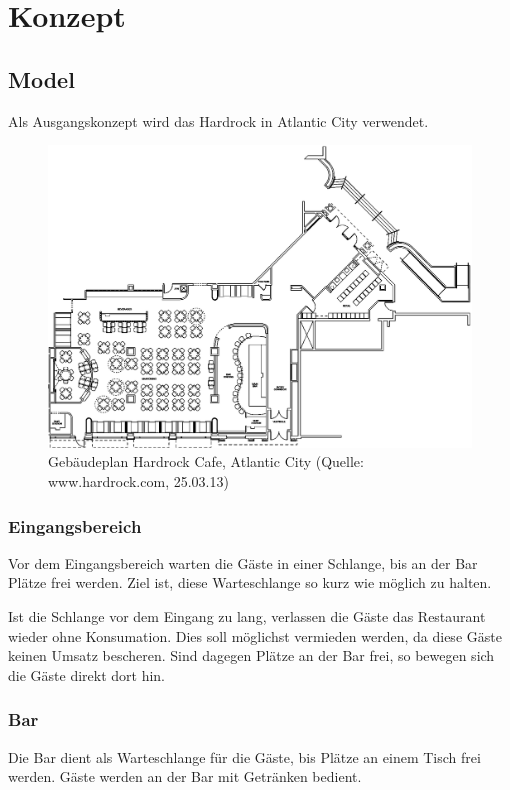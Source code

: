 \documentclass[ngerman,a4paper,12pt]{scrreprt}
\begin{document}
\tableofcontents


\chapter{Konzept}


\section{Model}
Als Ausgangskonzept wird das Hardrock in Atlantic City verwendet.
\begin{figure}[htp]
	\centering
		\includegraphics[width=1\textwidth]{img/hardrock-plan.png}
		\caption[Gebäudeplan Hardrock]{Gebäudeplan Hardrock Cafe, Atlantic City (Quelle: www.hardrock.com, 25.03.13)}
		\label{planHardrock}
\end{figure}

\subsection{Eingangsbereich}
Vor dem Eingangsbereich warten die Gäste in einer Schlange, bis an der Bar Plätze frei werden. Ziel ist, diese Warteschlange so kurz wie möglich zu halten. 

Ist die Schlange vor dem Eingang zu lang, verlassen die Gäste das Restaurant wieder ohne Konsumation. Dies soll möglichst vermieden werden, da diese Gäste keinen Umsatz bescheren. Sind dagegen Plätze an der Bar frei, so bewegen sich die Gäste direkt dort hin.

\subsection{Bar}
Die Bar dient als Warteschlange für die Gäste, bis Plätze an einem Tisch frei werden. Gäste werden an der Bar mit Getränken bedient.
\end{document}

